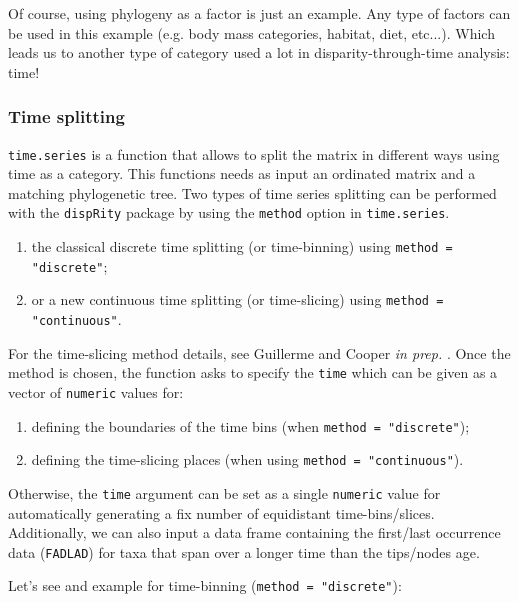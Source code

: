 \documentclass{article}\usepackage[]{graphicx}\usepackage[]{color}
\newcommand{\dispRity}{\texttt{dispRity} }
\begin{document}
Of course, using phylogeny as a factor is just an example.
Any type of factors can be used in this example (e.g. body mass categories, habitat, diet, etc...).
Which leads us to another type of category used a lot in disparity-through-time analysis: time!

\subsubsection{Time splitting}
\texttt{time.series} is a function that allows to split the matrix in different ways using time as a category.
This functions needs as input an ordinated matrix and a matching phylogenetic tree.
Two types of time series splitting can be performed with the \dispRity package by using the \texttt{method} option in \texttt{time.series}.
\begin{enumerate}
\item the classical discrete time splitting (or time-binning) using \texttt{method = "discrete"};
\item or a new continuous time splitting (or time-slicing) using \texttt{method = "continuous"}.
\end{enumerate}
For the time-slicing method details, see Guillerme and Cooper \textit{in prep.} \cite{GuillermeSTD}.
Once the method is chosen, the function asks to specify the \texttt{time} which can be given as a vector of \texttt{numeric} values for:
\begin{enumerate}
\item defining the boundaries of the time bins (when \texttt{method = "discrete"});
\item defining the time-slicing places (when using \texttt{method = "continuous"}).
\end{enumerate}
Otherwise, the \texttt{time} argument can be set as a single \texttt{numeric} value for automatically generating a fix number of equidistant time-bins/slices.
Additionally, we can also input a data frame containing the first/last occurrence data (\texttt{FADLAD}) for taxa that span over a longer time than the tips/nodes age.

Let's see and example for time-binning (\texttt{method = "discrete"}):
\end{document}
